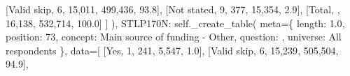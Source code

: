\documentclass[
  11pt,
  a4paper,
]{article}
\newenvironment{Shaded}{\begin{snugshade}}{\end{snugshade}}
\newcommand{\NormalTok}[1]{\textcolor[rgb]{0.00,0.23,0.31}{#1}}
\newcommand{\OperatorTok}[1]{\textcolor[rgb]{0.37,0.37,0.37}{#1}}
\newcommand{\StringTok}[1]{\textcolor[rgb]{0.13,0.47,0.30}{#1}}
\newcommand{\VariableTok}[1]{\textcolor[rgb]{0.07,0.07,0.07}{#1}}
\begin{document}
\begin{Shaded}
\begin{Highlighting}[]
\NormalTok{                    [}\StringTok{\textquotesingle{}Valid skip\textquotesingle{}}\NormalTok{, }\StringTok{\textquotesingle{}6\textquotesingle{}}\NormalTok{, }\StringTok{\textquotesingle{}15,011\textquotesingle{}}\NormalTok{, }\StringTok{\textquotesingle{}499,436\textquotesingle{}}\NormalTok{, }\StringTok{\textquotesingle{}93.8\textquotesingle{}}\NormalTok{],}
\NormalTok{                    [}\StringTok{\textquotesingle{}Not stated\textquotesingle{}}\NormalTok{, }\StringTok{\textquotesingle{}9\textquotesingle{}}\NormalTok{, }\StringTok{\textquotesingle{}377\textquotesingle{}}\NormalTok{, }\StringTok{\textquotesingle{}15,354\textquotesingle{}}\NormalTok{, }\StringTok{\textquotesingle{}2.9\textquotesingle{}}\NormalTok{],}
\NormalTok{                    [}\StringTok{\textquotesingle{}Total\textquotesingle{}}\NormalTok{, }\StringTok{\textquotesingle{}\textquotesingle{}}\NormalTok{, }\StringTok{\textquotesingle{}16,138\textquotesingle{}}\NormalTok{, }\StringTok{\textquotesingle{}532,714\textquotesingle{}}\NormalTok{, }\StringTok{\textquotesingle{}100.0\textquotesingle{}}\NormalTok{]}
\NormalTok{                ]}
\NormalTok{            ),}
            \StringTok{\textquotesingle{}STLP170N\textquotesingle{}}\NormalTok{: }\VariableTok{self}\NormalTok{.\_create\_table(}
\NormalTok{                meta}\OperatorTok{=}\NormalTok{\{}
                    \StringTok{\textquotesingle{}length\textquotesingle{}}\NormalTok{: }\StringTok{\textquotesingle{}1.0\textquotesingle{}}\NormalTok{, }\StringTok{\textquotesingle{}position\textquotesingle{}}\NormalTok{: }\StringTok{\textquotesingle{}73\textquotesingle{}}\NormalTok{,}
                    \StringTok{\textquotesingle{}concept\textquotesingle{}}\NormalTok{: }\StringTok{\textquotesingle{}Main source of funding {-} Other\textquotesingle{}}\NormalTok{,}
                    \StringTok{\textquotesingle{}question\textquotesingle{}}\NormalTok{: }\StringTok{\textquotesingle{}\textquotesingle{}}\NormalTok{,}
                    \StringTok{\textquotesingle{}universe\textquotesingle{}}\NormalTok{: }\StringTok{\textquotesingle{}All respondents\textquotesingle{}}
\NormalTok{                \},}
\NormalTok{                data}\OperatorTok{=}\NormalTok{[}
\NormalTok{                    [}\StringTok{\textquotesingle{}Yes\textquotesingle{}}\NormalTok{, }\StringTok{\textquotesingle{}1\textquotesingle{}}\NormalTok{, }\StringTok{\textquotesingle{}241\textquotesingle{}}\NormalTok{, }\StringTok{\textquotesingle{}5,547\textquotesingle{}}\NormalTok{, }\StringTok{\textquotesingle{}1.0\textquotesingle{}}\NormalTok{],}
\NormalTok{                    [}\StringTok{\textquotesingle{}Valid skip\textquotesingle{}}\NormalTok{, }\StringTok{\textquotesingle{}6\textquotesingle{}}\NormalTok{, }\StringTok{\textquotesingle{}15,239\textquotesingle{}}\NormalTok{, }\StringTok{\textquotesingle{}505,504\textquotesingle{}}\NormalTok{, }\StringTok{\textquotesingle{}94.9\textquotesingle{}}\NormalTok{],}

\end{Highlighting}
\end{Shaded}
\end{document}
